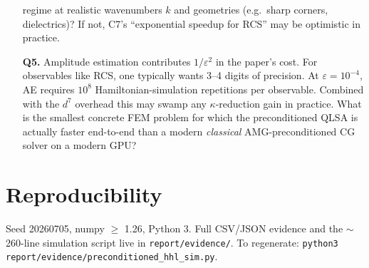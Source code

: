 \documentclass[11pt]{article}
\begin{document}
\begin{enumerate}
        regime at realistic wavenumbers $k$ and geometries (e.g.\ sharp
        corners, dielectrics)? If not, C7's ``exponential speedup for RCS''
        may be optimistic in practice.
  \item[\textbf{Q5.}] Amplitude estimation contributes $1/\varepsilon^{2}$
        in the paper's cost. For observables like RCS, one typically wants
        3--4 digits of precision. At $\varepsilon = 10^{-4}$, AE requires
        $10^{8}$ Hamiltonian-simulation repetitions per observable. Combined
        with the $d^{7}$ overhead this may swamp any $\kappa$-reduction gain
        in practice. What is the smallest concrete FEM problem for which the
        preconditioned QLSA is actually faster end-to-end than a modern
        \emph{classical} AMG-preconditioned CG solver on a modern GPU?
\end{enumerate}

\section*{Reproducibility}
Seed 20260705, numpy $\ge$ 1.26, Python 3. Full CSV/JSON evidence and the
$\sim$260-line simulation script live in \texttt{report/evidence/}. To
regenerate: \texttt{python3 report/evidence/preconditioned\_hhl\_sim.py}.
\end{document}
